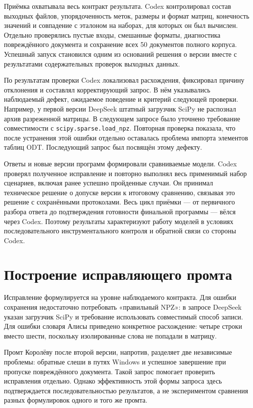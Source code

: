 Приёмка охватывала весь контракт результата. Codex контролировал состав выходных файлов, упорядоченность меток, размеры и формат матриц, конечность значений и совпадение с эталоном на наборах, для которых он был вычислен. Отдельно проверялись пустые входы, смешанные форматы, диагностика повреждённого документа и сохранение всех 50 документов полного корпуса. Успешный запуск становился одним из оснований решения о версии вместе с результатами содержательных проверок выходных данных.

По результатам проверки Codex локализовал расхождения, фиксировал причину отклонения и составлял корректирующий запрос. В нём указывались наблюдаемый дефект, ожидаемое поведение и критерий следующей проверки. Например, у первой версии DeepSeek штатный загрузчик SciPy не распознал архив разреженной матрицы. В следующем запросе было уточнено требование совместимости с \texttt{scipy.sparse.load\_npz}. Повторная проверка показала, что после устранения этой ошибки отдельно оставалась проблема импорта элементов таблиц ODT. Последующий запрос был посвящён этому дефекту.

Ответы и новые версии программ формировали сравниваемые модели. Codex проверял полученное исправление и повторно выполнял весь применимый набор сценариев, включая ранее успешно пройденные случаи. Он принимал техническое решение о допуске версии к итоговому сравнению, связывая это решение с сохранёнными протоколами. Весь цикл приёмки --- от первичного разбора ответа до подтверждения готовности финальной программы --- вёлся через Codex. Поэтому результаты характеризуют работу моделей в условиях последовательного инструментального контроля и обратной связи со стороны Codex.

\section{Построение исправляющего промта}
Исправление формулируется на уровне наблюдаемого контракта. Для ошибки сохранения недостаточно потребовать «правильный NPZ»: в запросе DeepSeek указан загрузчик SciPy и требование использовать совместимый способ записи. Для ошибки словаря Алисы приведено конкретное расхождение: четыре строки вместо шести, поскольку изолированные слова не попадали в матрицу.

Промт Королёву после второй версии, напротив, разделяет две независимые проблемы: обратные слеши в путях Windows и успешное завершение при пропуске повреждённого документа. Такой запрос помогает проверить исправления отдельно. Однако эффективность этой формы запроса здесь подтверждается последовательностью результатов, а не экспериментом сравнения разных формулировок одного и того же промта.

